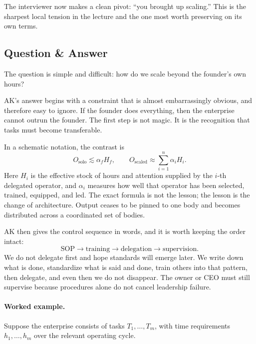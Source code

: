 The interviewer now makes a clean pivot: ``you brought up scaling.'' This is the sharpest local tension in the lecture and the one most worth preserving on its own terms.

\subsection{Question \& Answer}

The question is simple and difficult: how do we scale beyond the founder's own hours?

AK's answer begins with a constraint that is almost embarrassingly obvious, and therefore easy to ignore. If the founder does everything, then the enterprise cannot outrun the founder. The first step is not magic. It is the recognition that tasks must become transferable.

In a schematic notation, the contrast is
\begin{equation}
O_{\text{solo}} \lesssim \alpha_f H_f,
\qquad
O_{\text{scaled}} \approx \sum_{i=1}^{n} \alpha_i H_i.
\end{equation}
Here \(H_i\) is the effective stock of hours and attention supplied by the \(i\)-th delegated operator, and \(\alpha_i\) measures how well that operator has been selected, trained, equipped, and led. The exact formula is not the lesson; the lesson is the change of architecture. Output ceases to be pinned to one body and becomes distributed across a coordinated set of bodies.

AK then gives the control sequence in words, and it is worth keeping the order intact:
\begin{equation}
\mathrm{SOP} \longrightarrow \mathrm{training} \longrightarrow \mathrm{delegation} \longrightarrow \mathrm{supervision}.
\end{equation}
We do not delegate first and hope standards will emerge later. We write down what is done, standardize what is said and done, train others into that pattern, then delegate, and even then we do not disappear. The owner or CEO must still supervise because procedures alone do not cancel leadership failure.

\paragraph{Worked example.}
Suppose the enterprise consists of tasks \(T_1,\dots,T_m\), with time requirements \(h_1,\dots,h_m\) over the relevant operating cycle.

